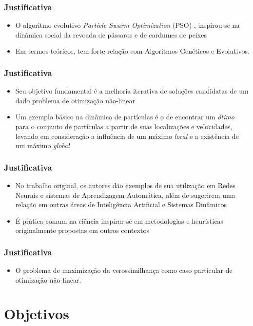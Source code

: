 \documentclass[aspectratio=169]{beamer}
\begin{document}
\begin{frame}
\frametitle{Justificativa}
\begin{itemize}
\item O algoritmo evolutivo \textit{Particle Swarm Optimization} (PSO) \cite{eberhart1995new}, inspirou-se na dinâmica social da revoada de pássaros e de cardumes de peixes
\item Em termos teóricos, tem forte relação com Algoritmos Genéticos e Evolutivos.
\end{itemize}

\end{frame}


\begin{frame}
\frametitle{Justificativa}
\begin{itemize}
\item Seu objetivo fundamental é a melhoria iterativa de soluções candidatas de um dado problema de otimização não-linear
\item Um exemplo básico na dinâmica de partículas é o de encontrar um \textit{ótimo} para o conjunto de partículas a partir de suas localizações e velocidades, levando em consideração a influência de um máximo \textit{local} e a existência de um máximo \textit{global}
\end{itemize}
\end{frame}

\begin{frame}
\frametitle{Justificativa}
\begin{itemize}
\item No trabalho original, os autores dão exemplos de sua utilização em Redes Neurais e sistemas de Aprendizagem Automática, além de sugerirem uma relação em outras áreas de Inteligência Artificial e Sistemas Dinâmicos
\item É prática comum na ciência inspirar-se em metodologias e heurísticas originalmente propostas em outros contextos
\end{itemize}
\end{frame}

\begin{frame}
\frametitle{Justificativa}
\begin{itemize}
\item O problema de maximização da verossimilhança como caso particular de otimização não-linear.
\end{itemize}
\end{frame}


\section{Objetivos}
\end{document}
